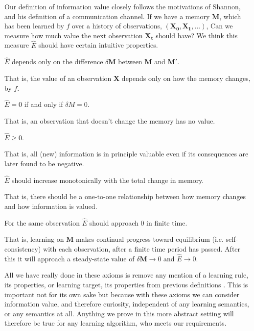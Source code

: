 Our definition of information value closely follows the motivations of Shannon, and his definition of a communication channel. If we have a memory $\mathbf{M}$, which has been learned by $f$ over a history of observations, $(\mathbf{X_0},\mathbf{X_1},...)$, Can we measure how much value the next observation $\mathbf{X_t}$ should have? We think this measure $\hat E$ should have certain intuitive properties.

\begin{axiom}
	$\hat E$ depends only on the difference $\delta \mathbf{M}$ between $\mathbf{M}$ and $\mathbf{M'}$.
\end{axiom}

That is, the value of an observation $\mathbf{X}$ depends only on how
the memory changes, by $f$. 

\begin{axiom}
	$\hat E = 0$ if and only if $\delta M = 0$. 
\end{axiom}

That is, an observation that doesn’t change the memory has no value.

\begin{axiom}
	$\hat E \ge 0$.
\end{axiom}

That is, all (new) information is in principle valuable even if its consequences are later found to be negative.

\begin{axiom}
	$\hat E$ should increase monotonically with the total change in memory. 
\end{axiom}

That is, there should be a one-to-one relationship between how memory changes and how information is valued.

\begin{axiom}
	For the same observation $\hat E$ should approach 0 in finite time.
\end{axiom}

That is, learning on $\mathbf{M}$ makes continual progress toward equilibrium (i.e. self-consistency) with each observation, after a finite time period has passed. After this it will approach a steady-state value of $\delta \mathbf{M} \rightarrow 0$ and $\hat E \rightarrow 0$.

All we have really done in these axioms is remove any mention of a learning rule, its properties, or learning target, its properties from previous definitions \cite{Itti2009,Jaegle2019,Schmidhuber1991,Inglis2001,Reddy2016,Pirolli2007}. This is important not for its own sake but because with these axioms we can consider information value, and therefore curiosity, independent of any learning semantics, or any semantics at all. Anything we prove in this more abstract setting will therefore be true for any learning algorithm, who meets our requirements. 

